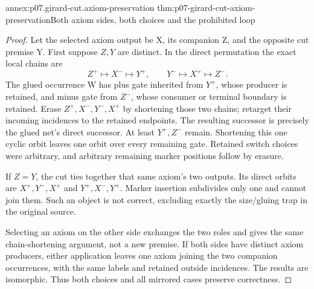 \begin{annexitem}{annex:p07.girard-cut.axiom-preservation}
 {thm:p07-girard-cut-axiom-preservation}{Both axiom sides, both choices and the prohibited loop}
\begin{proof}
Let the selected axiom output be X, its companion Z, and the opposite
cut premise Y. First suppose \(Z,Y\) are distinct.
In the direct permutation the exact local chains are
\[
 Z^+\mapsto X^-\mapsto Y^+,\qquad
 Y^-\mapsto X^+\mapsto Z^-.
\]
The glued occurrence W has plus gate inherited from \(Y^+\),
whose producer is retained, and minus gate from \(Z^-\),
whose consumer or terminal boundary is retained.
Erase \(Z^+,X^-,Y^-,X^+\) by shortening those two chains;
retarget their incoming incidences to the retained endpoints.
The resulting successor is precisely the glued net's direct successor.
At least \(Y^+,Z^-\) remain. Shortening this one cyclic orbit leaves
one orbit over every remaining gate. Retained switch choices were
arbitrary, and arbitrary remaining marker positions follow by erasure.

If \(Z=Y\), the cut ties together that same axiom's two outputs.
Its direct orbits are \(X^+,Y^-,X^+\) and \(Y^+,X^-,Y^+\).
Marker insertion subdivides only one and cannot join them.
Such an object is not correct, excluding exactly the size/gluing trap
in the original source.

Selecting an axiom on the other side exchanges the two roles and
gives the same chain-shortening argument, not a new premise.
If both sides have distinct axiom producers, either application leaves
one axiom joining the two companion occurrences, with the same labels
and retained outside incidences. The results are isomorphic.
Thus both choices and all mirrored cases preserve correctness.
\end{proof}
\end{annexitem}

